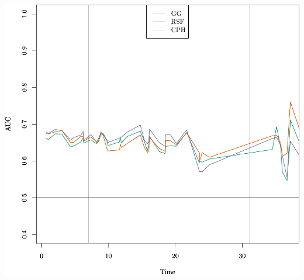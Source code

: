 \documentclass{article}\usepackage[]{graphicx}\usepackage[]{color}
\makeatletter
\def\maxwidth{ %
  \ifdim\Gin@nat@width>\linewidth
    \linewidth
  \else
    \Gin@nat@width
  \fi
}
\newenvironment{knitrout}{}{} %
\makeatother
\begin{document}
\begin{knitrout}
{\centering \includegraphics[width=\maxwidth]{figure/05-model-selection-roc-id-1} 

}



\end{knitrout}
\end{document}
